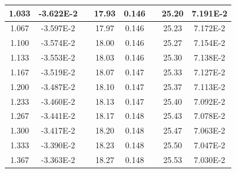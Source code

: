 \documentclass[article,12pt]{elsarticle}
\begin{document}
\begin{longtable}[c]{|c|c|cccccc}
1.033    & -3.622E-2 & \multicolumn{1}{c|}{} & \multicolumn{1}{c|}{17.93}   & \multicolumn{1}{c|}{0.146} & \multicolumn{1}{c|}{} & \multicolumn{1}{c|}{25.20}   & \multicolumn{1}{c|}{7.191E-2} \\ \hline
1.067    & -3.597E-2 & \multicolumn{1}{c|}{} & \multicolumn{1}{c|}{17.97}   & \multicolumn{1}{c|}{0.146} & \multicolumn{1}{c|}{} & \multicolumn{1}{c|}{25.23}   & \multicolumn{1}{c|}{7.172E-2} \\ \hline
1.100    & -3.574E-2 & \multicolumn{1}{c|}{} & \multicolumn{1}{c|}{18.00}   & \multicolumn{1}{c|}{0.146} & \multicolumn{1}{c|}{} & \multicolumn{1}{c|}{25.27}   & \multicolumn{1}{c|}{7.154E-2} \\ \hline
1.133    & -3.553E-2 & \multicolumn{1}{c|}{} & \multicolumn{1}{c|}{18.03}   & \multicolumn{1}{c|}{0.146} & \multicolumn{1}{c|}{} & \multicolumn{1}{c|}{25.30}   & \multicolumn{1}{c|}{7.138E-2} \\ \hline
1.167    & -3.519E-2 & \multicolumn{1}{c|}{} & \multicolumn{1}{c|}{18.07}   & \multicolumn{1}{c|}{0.147} & \multicolumn{1}{c|}{} & \multicolumn{1}{c|}{25.33}   & \multicolumn{1}{c|}{7.127E-2} \\ \hline
1.200    & -3.487E-2 & \multicolumn{1}{c|}{} & \multicolumn{1}{c|}{18.10}   & \multicolumn{1}{c|}{0.147} & \multicolumn{1}{c|}{} & \multicolumn{1}{c|}{25.37}   & \multicolumn{1}{c|}{7.113E-2} \\ \hline
1.233    & -3.460E-2 & \multicolumn{1}{c|}{} & \multicolumn{1}{c|}{18.13}   & \multicolumn{1}{c|}{0.147} & \multicolumn{1}{c|}{} & \multicolumn{1}{c|}{25.40}   & \multicolumn{1}{c|}{7.092E-2} \\ \hline
1.267    & -3.441E-2 & \multicolumn{1}{c|}{} & \multicolumn{1}{c|}{18.17}   & \multicolumn{1}{c|}{0.148} & \multicolumn{1}{c|}{} & \multicolumn{1}{c|}{25.43}   & \multicolumn{1}{c|}{7.078E-2} \\ \hline
1.300    & -3.417E-2 & \multicolumn{1}{c|}{} & \multicolumn{1}{c|}{18.20}   & \multicolumn{1}{c|}{0.148} & \multicolumn{1}{c|}{} & \multicolumn{1}{c|}{25.47}   & \multicolumn{1}{c|}{7.063E-2} \\ \hline
1.333    & -3.390E-2 & \multicolumn{1}{c|}{} & \multicolumn{1}{c|}{18.23}   & \multicolumn{1}{c|}{0.148} & \multicolumn{1}{c|}{} & \multicolumn{1}{c|}{25.50}   & \multicolumn{1}{c|}{7.047E-2} \\ \hline
1.367    & -3.363E-2 & \multicolumn{1}{c|}{} & \multicolumn{1}{c|}{18.27}   & \multicolumn{1}{c|}{0.148} & \multicolumn{1}{c|}{} & \multicolumn{1}{c|}{25.53}   & \multicolumn{1}{c|}{7.030E-2} \\ \hline

\end{longtable}
\end{document}
